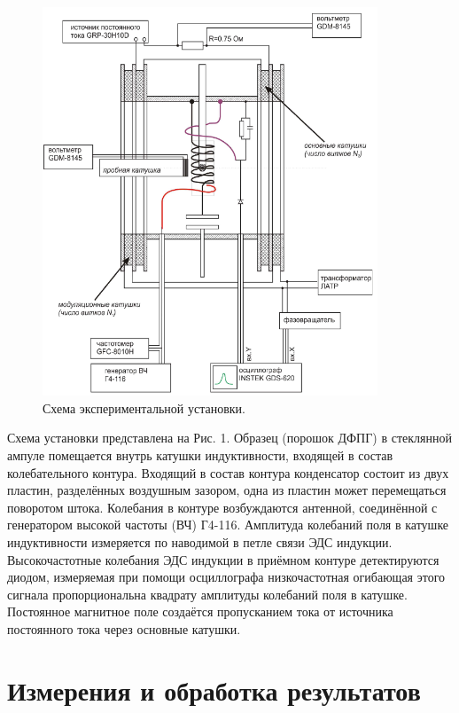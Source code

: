 \documentclass[a4paper,12pt]{article}
\begin{document}
    \begin{figure}[H]
  \begin{center}
    \includegraphics[width=10cm]{ex1.png}
    \caption{Схема экспериментальной установки.}
    \label{fig:}
  \end{center}
\end{figure}
 
	
Схема установки представлена на Рис. 1. Образец (порошок ДФПГ) в стеклянной ампуле помещается внутрь катушки индуктивности, входящей в состав колебательного контура. Входящий в состав контура конденсатор состоит из двух пластин, разделённых воздушным зазором, одна из пластин может перемещаться поворотом штока. Колебания в контуре возбуждаются антенной, соединённой с генератором высокой частоты (ВЧ) Г4-116. Амплитуда колебаний поля в катушке индуктивности
измеряется по наводимой в петле связи ЭДС индукции. Высокочастотные колебания ЭДС
индукции в приёмном контуре детектируются диодом, измеряемая при помощи
осциллографа низкочастотная огибающая этого сигнала пропорциональна квадрату
амплитуды колебаний поля в катушке.\\
Постоянное магнитное поле создаётся пропусканием тока от источника постоянного тока через основные катушки. 


\section{Измерения и обработка результатов}
\end{document}
